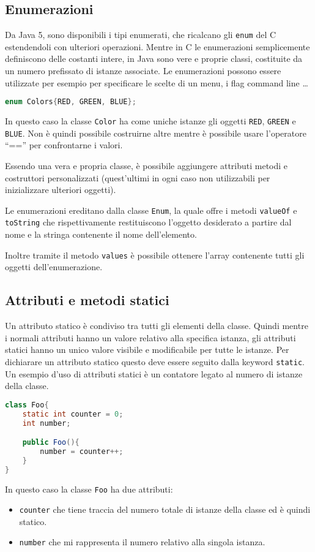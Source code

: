 \documentclass{article}
\begin{document}
\subsection{Enumerazioni}

Da Java 5, sono disponibili i tipi enumerati, che
ricalcano gli \texttt{enum} del C estendendoli con
ulteriori operazioni.
Mentre in C le enumerazioni semplicemente definiscono delle
costanti intere, in Java sono vere e proprie classi,
costituite da un numero prefissato di istanze associate. Le enumerazioni possono essere utilizzate per esempio per specificare le scelte di un menu, i flag command line \ldots
\begin{lstlisting}[language=Java,escapechar=|]
enum Colors{RED, GREEN, BLUE};
\end{lstlisting}  
In questo caso la classe \texttt{Color}
ha come uniche istanze gli oggetti \texttt{RED},
\texttt{GREEN} e \texttt{BLUE}.
Non è quindi possibile costruirne altre mentre è possibile
usare l'operatore ``=='' per confrontarne i valori.

Essendo una vera e propria classe, è possibile aggiungere
attributi metodi e
costruttori personalizzati (quest'ultimi in ogni caso non utilizzabili per inizializzare ulteriori oggetti).

Le enumerazioni ereditano dalla classe \texttt{Enum},
la quale offre i metodi \texttt{valueOf} e \texttt{toString}
che rispettivamente restituiscono l'oggetto desiderato
a partire dal nome e la stringa contenente il nome dell'elemento.

Inoltre tramite il metodo \texttt{values} è possibile ottenere
l'array contenente tutti gli oggetti dell'enumerazione.

\subsection{Attributi e metodi statici}

Un attributo statico è condiviso tra tutti gli elementi della classe.
Quindi mentre i normali attributi hanno un valore relativo
alla specifica istanza, gli attributi statici hanno un unico
valore visibile e modificabile per tutte le istanze.
Per dichiarare un attributo statico questo deve essere seguito
dalla keyword \texttt{static}.
Un esempio d'uso di attributi statici
è un contatore legato al numero di istanze della classe. 
\begin{lstlisting}[language=Java,escapechar=|]
class Foo{
    static int counter = 0;
    int number;

    public Foo(){
	    number = counter++;
    }
}
\end{lstlisting} 
In questo caso la classe \texttt{Foo} ha due attributi:
\begin{itemize}
	\item \texttt{counter} che tiene traccia del numero totale
		di istanze della classe ed è quindi statico.
	\item \texttt{number} che mi rappresenta il numero relativo 
		alla singola istanza.
\end{itemize}
\end{document}
